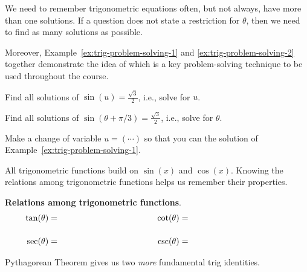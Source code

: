 \documentclass[../main.tex]{subfiles}
\begin{document}
We need to remember trigonometric equations often, but not always, have more than one solutions.
If a question does not state a restriction for \(\theta\), then we need to find as many solutions as possible.

Moreover, Example~\ref{ex:trig-problem-solving-1} and \ref{ex:trig-problem-solving-2} together demonstrate the idea of  which is a key problem-solving technique to be used throughout the course.
\begin{example} \label{ex:trig-problem-solving-1}
  Find all solutions of \(\sin(u) = \frac{\sqrt{3}}{2}\), i.e., solve for \(u\).

\end{example}

\begin{example} \label{ex:trig-problem-solving-2}
  Find all solutions of \(\sin(\theta + \pi/3) = \frac{\sqrt{3}}{2}\), i.e., solve for \(\theta\).

  {\footnotesize Make a change of variable \(u = (\cdots)\) so that you can  the solution of Example~\ref{ex:trig-problem-solving-1}.}


\end{example}
\clearpage



All trigonometric functions build on \(\sin(x)\) and \(\cos(x)\).  Knowing the relations among trigonometric functions helps us remember their properties.

\begin{mdframed}[style=simple-compact]
  \textbf{Relations among trigonometric functions}.
  \begin{align}
    \tan(\theta) &= \hspace{1.5in} & \cot(\theta) &= \hspace{1.5in}& \\[3ex]
    \sec(\theta) &= \hspace{1.5in} & \csc(\theta) &= \hspace{1.5in}& 
  \end{align}

  Pythagorean Theorem gives us two \emph{more} fundamental trig identities.
  \vspace{1.5in}
\end{mdframed}
\end{document}
